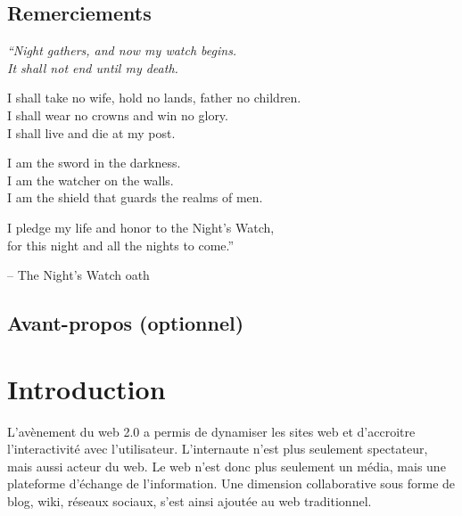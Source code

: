 \documentclass{tnreport}
\begin{document}
  
\maketitle
{}


\cleardoublepage

\makesecondtitle

\section*{Remerciements}

{\em
``Night gathers, and now my watch begins. \\
It shall not end until my death.

I shall take no wife, hold no lands, father no children. \\
I shall wear no crowns and win no glory. \\
I shall live and die at my post.

I am the sword in the darkness. \\
I am the watcher on the walls. \\
I am the shield that guards the realms of men.

I pledge my life and honor to the Night's Watch, \\
for this night and all the nights to come.''
}

\hspace{4cm} -- The Night's Watch oath


\cleardoublepage

\section*{Avant-propos (optionnel)}


\cleardoublepage

\renewcommand{\baselinestretch}{0.5}\normalsize
\tableofcontents
\renewcommand{\baselinestretch}{1.0}\normalsize
\cleardoublepage

\setcounter{page}{1}

\chapter{Introduction}

L'avènement du web 2.0 a permis de dynamiser les sites web et d'accroitre l'interactivité avec l'utilisateur. L'internaute n'est plus 
seulement spectateur, mais aussi acteur du web. Le web n'est donc plus seulement un média, mais une plateforme d'échange de 
l'information. Une dimension collaborative sous forme de blog, wiki, réseaux sociaux, s'est ainsi ajoutée au web traditionnel. 
\end{document}
